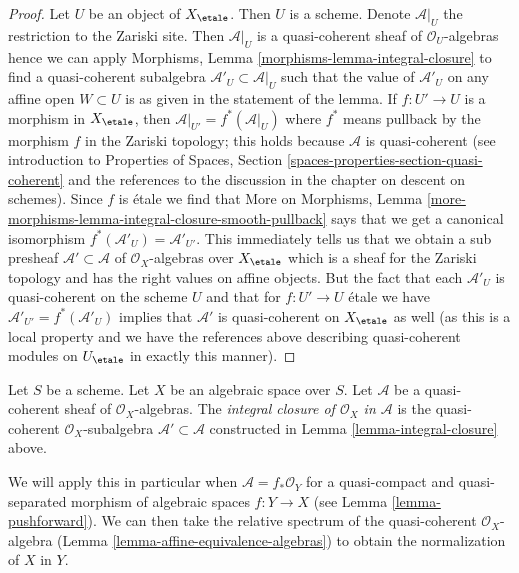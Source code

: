 \begin{proof}
Let $U$ be an object of $X_\etale$. Then $U$ is a scheme. Denote
$\mathcal{A}|_U$ the restriction to the Zariski site. Then
$\mathcal{A}|_U$ is a quasi-coherent sheaf of $\mathcal{O}_U$-algebras
hence we can apply Morphisms, Lemma \ref{morphisms-lemma-integral-closure}
to find a quasi-coherent subalgebra $\mathcal{A}'_U \subset \mathcal{A}|_U$
such that the value of $\mathcal{A}'_U$ on any affine open $W \subset U$
is as given in the statement of the lemma. If $f : U' \to U$ is a morphism
in $X_\etale$, then $\mathcal{A}|_{U'} = f^*(\mathcal{A}|_U)$
where $f^*$ means pullback by the morphism $f$ in the Zariski topology;
this holds because $\mathcal{A}$ is quasi-coherent (see introduction
to Properties of Spaces, Section \ref{spaces-properties-section-quasi-coherent}
and the references to the discussion in the chapter on
descent on schemes). Since $f$ is \'etale we find that
More on Morphisms, Lemma
\ref{more-morphisms-lemma-integral-closure-smooth-pullback}
says that we get a canonical isomorphism
$f^*(\mathcal{A}'_U) = \mathcal{A}'_{U'}$.
This immediately tells us that we obtain a sub presheaf
$\mathcal{A}' \subset \mathcal{A}$ of $\mathcal{O}_X$-algebras
over $X_\etale$ which is a sheaf for the Zariski
topology and has the right values on affine objects.
But the fact that each $\mathcal{A}'_U$ is quasi-coherent
on the scheme $U$ and that for $f : U' \to U$ \'etale we have
$\mathcal{A}'_{U'} = f^*(\mathcal{A}'_U)$ implies that $\mathcal{A}'$
is quasi-coherent on $X_\etale$ as well (as this is a local property
and we have the references above describing quasi-coherent modules
on $U_\etale$ in exactly this manner).
\end{proof}

\begin{definition}
\label{definition-integral-closure}
Let $S$ be a scheme. Let $X$ be an algebraic space over $S$.
Let $\mathcal{A}$ be a quasi-coherent sheaf of $\mathcal{O}_X$-algebras.
The {\it integral closure of $\mathcal{O}_X$ in $\mathcal{A}$} is the
quasi-coherent $\mathcal{O}_X$-subalgebra $\mathcal{A}' \subset \mathcal{A}$
constructed in Lemma \ref{lemma-integral-closure} above.
\end{definition}

\noindent
We will apply this in particular when $\mathcal{A} = f_*\mathcal{O}_Y$
for a quasi-compact and quasi-separated morphism of algebraic spaces
$f : Y \to X$ (see Lemma \ref{lemma-pushforward}). We can then take
the relative spectrum of the quasi-coherent $\mathcal{O}_X$-algebra
(Lemma \ref{lemma-affine-equivalence-algebras}) to obtain the
normalization of $X$ in $Y$.

